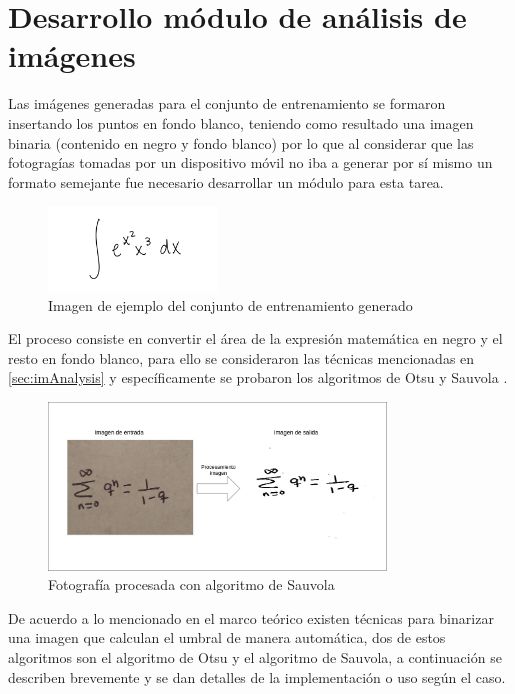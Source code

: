 \section{Desarrollo módulo de análisis de imágenes}

Las imágenes generadas para el conjunto de entrenamiento se formaron insertando los puntos en fondo blanco, teniendo como resultado una imagen binaria (contenido en negro y fondo blanco) por lo que al considerar que las fotogragías tomadas por un dispositivo móvil no iba a generar por sí mismo un formato semejante fue necesario desarrollar un módulo para esta tarea.

\begin{figure}[h]
	\centering
	\includegraphics[width=0.4\textwidth]{capitulo5/imageprocessor/example_dataset.png}
	\caption{Imagen de ejemplo del conjunto de entrenamiento generado}
	\label{fig:example_dataset}
\end{figure}

El proceso consiste en convertir el área de la expresión matemática en negro y el resto en fondo blanco, para ello se consideraron las técnicas mencionadas en \ref{sec:imAnalysis}
 y específicamente se probaron los algoritmos de Otsu y Sauvola \cite{inproceedings}.
 
\begin{figure}[h]
	\centering
	\includegraphics[width=0.8\textwidth]{capitulo5/imageprocessor/IO_image.jpg}
	\caption{Fotografía procesada con algoritmo de Sauvola}
	\label{fig:process_image}
\end{figure}

De acuerdo a lo mencionado en el marco teórico existen técnicas para binarizar una imagen que calculan el umbral de manera automática, dos de estos algoritmos son el algoritmo de Otsu y el algoritmo de Sauvola, a continuación se describen brevemente y se dan detalles de la implementación o uso según el caso.
\newpage
